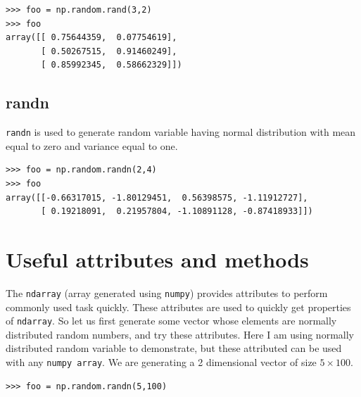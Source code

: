\documentclass[10pt]{book}
\begin{document}
{\beforeverb \begin{verbatim}
>>> foo = np.random.rand(3,2)
>>> foo
array([[ 0.75644359,  0.07754619],
       [ 0.50267515,  0.91460249],
       [ 0.85992345,  0.58662329]])
\end{verbatim} \afterverb

\subsection{randn}
\verb"randn" is used to generate random variable having normal distribution with mean equal to zero and variance equal to one.

\beforeverb
\begin{verbatim}
>>> foo = np.random.randn(2,4)
>>> foo
array([[-0.66317015, -1.80129451,  0.56398575, -1.11912727],
       [ 0.19218091,  0.21957804, -1.10891128, -0.87418933]])
\end{verbatim}
\afterverb

\section{Useful attributes and methods}
The \verb"ndarray" (array generated using \verb"numpy") provides attributes to perform commonly used task quickly. These attributes are used to quickly get  properties of \verb"ndarray". So let us first generate some vector whose elements are normally distributed random numbers, and try these attributes. Here I am using normally distributed random variable to demonstrate, but these attributed can be used with any \verb"numpy array". We are generating a 2 dimensional vector of size $5 \times 100$.
\beforeverb \begin{verbatim}
>>> foo = np.random.randn(5,100)
\end{verbatim} \afterverb

}
\end{document}
